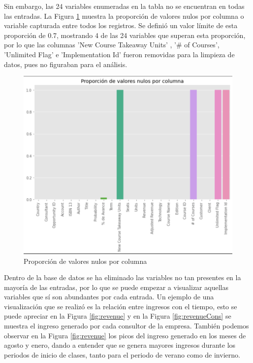 \documentclass{article}
\begin{document}
        Sin embargo, las 24 variables enumeradas en la tabla no se encuentran en todas las entradas. La Figura \ref{fig:propValNul} muestra la proporción de valores nulos por columna o variable capturada entre todos los registros. Se definió un valor límite de esta proporción de 0.7, mostrando 4 de las 24 variables que superan esta proporción, por lo que las columnas 'New Course Takeaway Units' , '$\#$ of Courses', 'Unlimited Flag' e 'Implementation Id' fueron removidas para la limpieza de datos, pues no figuraban para el análisis.
        \newpage
        \begin{figure}[h!]
            \centering
            \includegraphics[width=\columnwidth]{proporcionNulos.png}
            \caption{Proporción de valores nulos por columna}
            \label{fig:propValNul}
        \end{figure}

        Dentro de la base de datos se ha eliminado las variables no tan presentes en la mayoría de las entradas, por lo que se puede empezar a visualizar aquellas variables que sí son abundantes por cada entrada. Un ejemplo de una visualización que se realizó es la relación entre ingresos con el tiempo, esto se puede apreciar en la Figura \ref{fig:revenue} y en la Figura \ref{fig:revenueCons} se muestra el ingreso generado por cada consultor de la empresa.
        También podemos observar en la Figura \ref{fig:revenue} los picos del ingreso generado en los meses de agosto y enero, dando a entender que se genera mayores ingresos durante los periodos de inicio de clases, tanto para el periodo de verano como de invierno.
\end{document}
